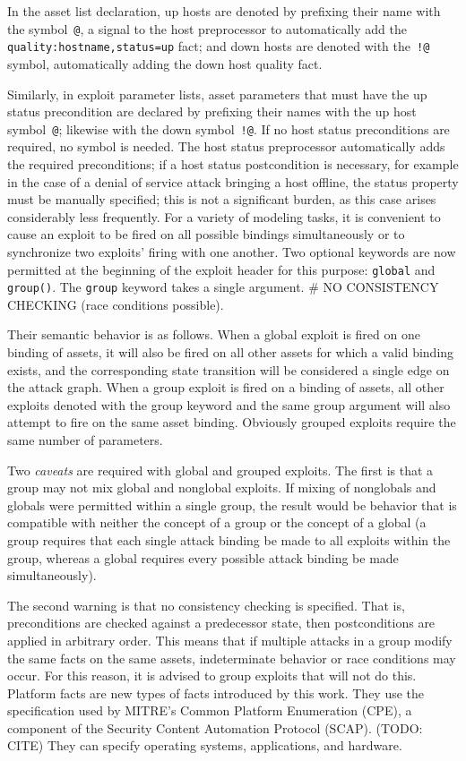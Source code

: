 In the asset list declaration, up hosts are denoted by prefixing their name with
the symbol~\texttt{@}, a signal to the host preprocessor to automatically add
the \texttt{quality:hostname,status=up} fact; and down hosts are denoted with
the~\texttt{!@} symbol, automatically adding the down host quality fact.

Similarly, in exploit parameter lists, asset parameters that must have the
up status precondition are declared by prefixing their names with the up host 
symbol~\texttt{@}; likewise with the down symbol~\texttt{!@}. If no host
status preconditions are required, no symbol is needed. The host status
preprocessor automatically adds the required preconditions; if a host status
postcondition is necessary, for example in the case of a denial of service
attack bringing a host offline, the status property must be manually specified;
this is not a significant burden, as this case arises considerably less
frequently.
For a variety of modeling tasks, it is convenient to cause an exploit to be
fired on all possible bindings simultaneously or to synchronize two exploits'
firing with one another. Two optional keywords are now permitted at the beginning
of the exploit header for this purpose: \texttt{global} and \texttt{group()}.
The \texttt{group} keyword takes a single argument.
# NO CONSISTENCY CHECKING (race conditions possible).

Their semantic behavior
is as follows. When a global exploit is fired on one binding of assets, it will
also be fired on all other assets for which a valid binding exists, and the
corresponding state transition will be considered a single edge on the attack
graph. When a group exploit is fired on a binding of assets, all other exploits
denoted with the group keyword and the same group argument will also attempt
to fire on the same asset binding. Obviously grouped exploits require the same
number of parameters.

Two \emph{caveats} are required with global and grouped exploits. The first
is that a group may not mix global and nonglobal exploits. If mixing of
nonglobals and globals were permitted within a single group, the result would
be behavior that is compatible with neither the concept of a group or the
concept of a global (a group requires that each single attack binding be made
to all exploits within the group, whereas a global requires every possible
attack binding be made simultaneously).

The second warning is that no consistency checking is specified. That is,
preconditions are checked against a predecessor state, then postconditions
are applied in arbitrary order. This means that if multiple attacks in a group
modify the same facts on the same assets, indeterminate behavior or race
conditions may occur. For this reason, it is advised to group exploits that
will not do this.
Platform facts are new types of facts introduced by this work. They use the
specification used by MITRE's Common Platform Enumeration (CPE), a component
of the Security Content Automation Protocol (SCAP). (TODO: CITE)
They can specify operating systems, applications, and hardware.

